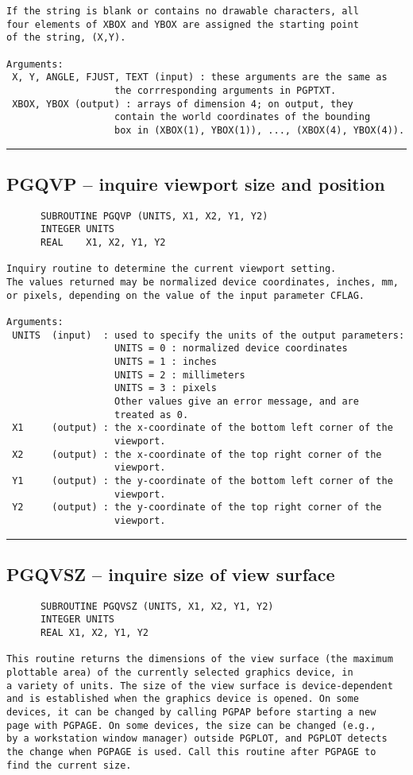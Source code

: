 {\begin{verbatim}
If the string is blank or contains no drawable characters, all
four elements of XBOX and YBOX are assigned the starting point
of the string, (X,Y).

Arguments:
 X, Y, ANGLE, FJUST, TEXT (input) : these arguments are the same as
                   the corrresponding arguments in PGPTXT.
 XBOX, YBOX (output) : arrays of dimension 4; on output, they
                   contain the world coordinates of the bounding
                   box in (XBOX(1), YBOX(1)), ..., (XBOX(4), YBOX(4)).
\end{verbatim}
\hrule


\subsection*{PGQVP -- inquire viewport size and position }
\begin{verbatim}
      SUBROUTINE PGQVP (UNITS, X1, X2, Y1, Y2)
      INTEGER UNITS
      REAL    X1, X2, Y1, Y2

Inquiry routine to determine the current viewport setting.
The values returned may be normalized device coordinates, inches, mm,
or pixels, depending on the value of the input parameter CFLAG.

Arguments:
 UNITS  (input)  : used to specify the units of the output parameters:
                   UNITS = 0 : normalized device coordinates
                   UNITS = 1 : inches
                   UNITS = 2 : millimeters
                   UNITS = 3 : pixels
                   Other values give an error message, and are
                   treated as 0.
 X1     (output) : the x-coordinate of the bottom left corner of the
                   viewport.
 X2     (output) : the x-coordinate of the top right corner of the
                   viewport.
 Y1     (output) : the y-coordinate of the bottom left corner of the
                   viewport.
 Y2     (output) : the y-coordinate of the top right corner of the
                   viewport.
\end{verbatim}
\hrule


\subsection*{PGQVSZ -- inquire size of view surface }
\begin{verbatim}
      SUBROUTINE PGQVSZ (UNITS, X1, X2, Y1, Y2)
      INTEGER UNITS
      REAL X1, X2, Y1, Y2

This routine returns the dimensions of the view surface (the maximum
plottable area) of the currently selected graphics device, in 
a variety of units. The size of the view surface is device-dependent
and is established when the graphics device is opened. On some 
devices, it can be changed by calling PGPAP before starting a new
page with PGPAGE. On some devices, the size can be changed (e.g.,
by a workstation window manager) outside PGPLOT, and PGPLOT detects
the change when PGPAGE is used. Call this routine after PGPAGE to 
find the current size.


\end{verbatim}}
